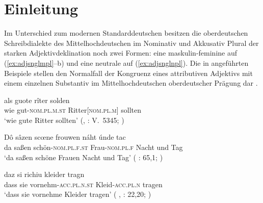 \chapter{Einleitung}
\label{ch:einleitung}

Im Unterschied zum modernen Standarddeutschen besitzen die
oberdeutschen Schreib\-dialekte des
Mittelhochdeutschen im Nominativ und Akkusativ Plural der
starken Adjektivdeklination noch zwei Formen: eine maskulin-feminine auf
 (\ref{ex:adjsnglmpl}--b) und eine neutrale auf
 (\ref{ex:adjsnglnpl}). Die in  angeführten
Beispiele stellen den Normalfall der Kongruenz eines attributiven Adjektivs mit
einem einzelnen Substantiv im Mittelhochdeutschen
oberdeutscher Prägung dar
\autocites[vgl.][181--184]{ksw2}[200--203]{paul2007}.

\begin{exe}
\ex \label{ex:adjsngl}
	\begin{xlist}
	\ex \label{ex:adjsnglmpl}
		\gll als guote rîter solden \\
			wie gut-\textsc{nom.pl.m.st} Ritter[\textsc{nom.pl.m}] sollten \\
	\trans `wie gute Ritter sollten'
		(, : V.~5345;
			\cite[606]{mertens2004}%
		)

	\ex \label{ex:adjsnglfpl}
		\gll Dô sâzen scœne frouwen náht únde tac \\
			da saßen schön-\textsc{nom.pl.f.st} Frau-\textsc{nom.pl.f} Nacht 
			und	Tag \\
	\trans `da saßen schöne Frauen Nacht und Tag'
		(%
			: 65,1;
			\cite[16]{deboor1988}%
		)

	\ex \label{ex:adjsnglnpl}
		\gll daz si richiu kleider tragn \\
			dass sie vornehm-\textsc{acc.pl.n.st} Kleid-\textsc{acc.pl.n}
			tragen \\
		\trans `dass sie vornehme Kleider tragen'
			(%
				, : 22,20;
				\cite[24]{knechtschirok2003}%
			)
\end{xlist}
\end{exe}

